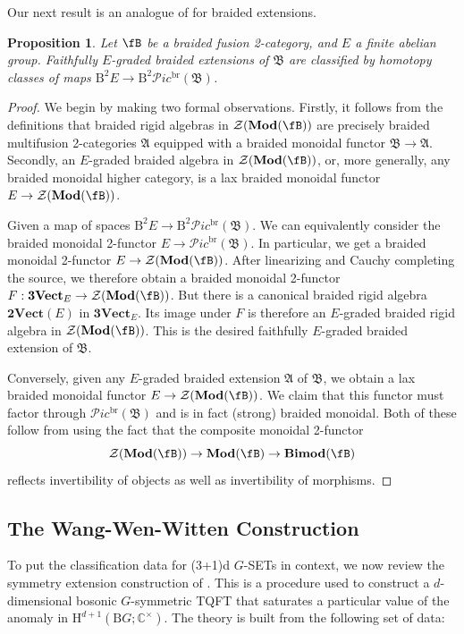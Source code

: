 \documentclass[11pt,reqno]{amsart}
\newcommand{\Mod}{\mathbf{Mod}}
\newcommand{\sPic}{\mathscr{P}ic}
\newcommand{\cZ}{\mathcal{Z}}
\newcommand{\rH}{\mathrm{H}}
\newcommand{\rB}{\mathrm{B}}
\numberwithin{equation}{section}
\theoremstyle{plain}
\newtheorem{prop}[equation]{Proposition}
\theoremstyle{definition}
\begin{document}
Our next result is an analogue of \cite[Theorem 3.11]{D11} for braided extensions.

\begin{prop}\label{prop:braidedextn}
    Let $\fB$ be a braided fusion 2-category, and $E$ a finite abelian group. Faithfully $E$-graded braided extensions of $\mathfrak{B}$ are classified by homotopy classes of maps $\rB^2 E \rightarrow \rB^2 \sPic^{\mathrm{br}}(\mathfrak{B})$.
\end{prop}
\begin{proof}
We begin by making two formal observations. Firstly, it follows from the definitions that braided rigid algebras in $\cZ(\Mod (\fB))$ are precisely braided multifusion 2-categories $\mathfrak{A}$ equipped with a braided monoidal functor $\mathfrak{B}\rightarrow \mathfrak{A}$. Secondly, an $E$-graded braided algebra in $\cZ(\Mod (\fB))$, or, more generally, any braided monoidal higher category, is a lax braided monoidal functor $E\rightarrow \cZ(\Mod (\fB))$.

Given a map of spaces $\rB^2 E \rightarrow \rB^2 \sPic^{\mathrm{br}}(\mathfrak{B})$. We can equivalently consider the braided monoidal 2-functor $E\rightarrow \sPic^{\mathrm{br}}(\mathfrak{B})$. In particular, we get a braided monoidal 2-functor $E \rightarrow \cZ(\Mod (\fB))$. After linearizing and Cauchy completing the source, we therefore obtain a braided monoidal 2-functor $F:\mathbf{3Vect}_E \rightarrow \cZ(\Mod (\fB))$. But there is a canonical braided rigid algebra $\mathbf{2Vect}(E)$ in $\mathbf{3Vect}_E$. Its image under $F$ is therefore an $E$-graded braided rigid algebra in $\cZ(\Mod (\fB))$. This is the desired faithfully $E$-graded braided extension of $\mathfrak{B}$.

Conversely, given any $E$-graded braided extension $\mathfrak{A}$ of $\mathfrak{B}$, we obtain a lax braided monoidal functor $E \rightarrow \cZ(\Mod (\fB))$. We claim that this functor must factor through $\sPic^{\mathrm{br}}(\mathfrak{B})$ and is in fact (strong) braided monoidal. Both of these follow from \cite[Theorem 3.11]{D11} using the fact that the composite monoidal 2-functor $$\cZ(\Mod (\fB))\rightarrow \Mod (\fB)\rightarrow \mathbf{Bimod}(\fB)$$ reflects invertibility of objects as well as invertibility of morphisms.
\end{proof}


\subsection{The Wang-Wen-Witten Construction}\label{subsection:WWW}
To put the classification data for (3+1)d $G$-SETs in context, we now review the symmetry extension construction of \cite{Wang:2017loc}. This is a procedure used to construct a $d$-dimensional bosonic $G$-symmetric TQFT that saturates a particular value of the anomaly in $\rH^{d+1}(\rB G;\mathbb C^\times)$. The theory is built from the following set of data:
\end{document}
